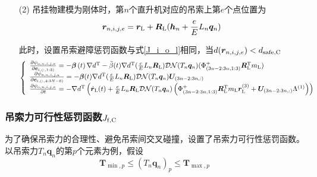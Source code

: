 \begin{enumerate}
\item [(2)] 吊挂物建模为刚体时，第$n$个直升机对应的吊索上第$e$个点位置为
\begin{equation}
    \boldsymbol{r}_{n,i,j,e} = \boldsymbol{r}_{\rm{L}} + \boldsymbol{R}_{\rm{L}} (\boldsymbol{h}_n + \frac{e}{E}L_n \boldsymbol{q}_n)
\end{equation}

此时，设置吊索避障惩罚函数与式\ref{J_i_o_l}相同，当$d(\boldsymbol{r}_{n,i,j,e}) < d_{{\rm{safe,C}}}$
\begin{equation}
    \left\{\begin{array}{l}
        \frac{\partial \psi_{{\rm{o}}, n,i,j,e}}{\partial \boldsymbol{c}_{i,(:,1:3)}} = - \boldsymbol{\beta}\left(t\right) \nabla d^{\rm{T}} - \ddot{\beta}(t)\nabla d^{\rm{T}}(\frac{e}{E}L_n\boldsymbol{R}_{\rm{L}})\mathcal{DN}(T_n\boldsymbol{q}_n)(\Phi^{+}_{(3n-2:3n,1:3)}\boldsymbol{R}{\rm{^T_L}}m_{\rm{L}})\\
        \frac{\partial \psi_{{\rm{o}}, n,i,j,e}}{\partial \boldsymbol{c}_{i,(:,4:3N-6)}} = - \boldsymbol{\beta}(t) \nabla d^{\rm{T}} (\frac{e}{E}L_n\boldsymbol{R}_{\rm{L}}) \mathcal{DN}(T_n\boldsymbol{q}_n) \boldsymbol{U}_{(3n-2:3n, :)} \\
        \frac{\partial \psi_{{\rm{o}}, n,i,j,e}}{\partial t} = -\nabla d^{\rm{T}} \left(
            \dot{\boldsymbol{r}}_{\rm{L}}(t) + \frac{e}{E}L_n\boldsymbol{R}_{\rm{L}}\mathcal{DN}(T_n\boldsymbol{q}_n)\left(
                \Phi^{+}_{(3n-2:3n,1:3)}\boldsymbol{R}{\rm{_L^T}}m_{\rm{L}}\boldsymbol{r}_{\rm{L}}^{(3)} + \boldsymbol{U}_{(3n-2:3n, :)} {\Lambda}^{(1)}
            \right)
        \right) 
    \end{array}
    \right.
\end{equation}
\end{enumerate}

\subsubsection{吊索力可行性惩罚函数$J_{\rm{f,C}}$}
为了确保吊索力的合理性、避免吊索间交叉碰撞，设置了吊索力可行性惩罚函数。以吊索力$T_n\boldsymbol{q}_n$的第$p$个元素为例，假设
\begin{equation}
    \boldsymbol{T}_{\min,p} \le (T_n\boldsymbol{q}_n)_{p} \le \boldsymbol{T}_{\max,p}
\end{equation}


